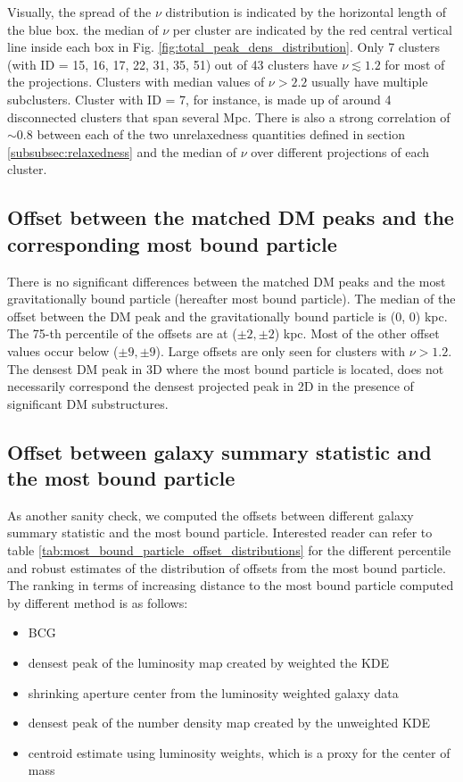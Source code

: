 Visually, the spread of the $\nu$ distribution is indicated by the horizontal 
length of the blue box. 
the median of $\nu$ per cluster are indicated by the red central vertical line
inside each box in Fig. 
\ref{fig:total_peak_dens_distribution}.
Only 7 clusters (with ID = 15, 16, 17, 22, 31, 35, 51) out of 43 clusters have $\nu
\lesssim 1.2$ for most of the projections.
Clusters with median values of $\nu > 2.2$ usually have multiple subclusters.
Cluster with ID = 7, for instance, is made up of around 4 disconnected clusters that span
several Mpc.  
There is also a strong correlation of $\sim 0.8$ 
between each of the two unrelaxedness quantities defined in section 
\ref{subsubsec:relaxedness}
and the median of $\nu$ over different projections of each cluster. 


\subsection{Offset between the matched DM peaks and the corresponding most
bound particle}
There is no significant differences between the matched DM peaks and 
the most gravitationally 
bound particle (hereafter most bound particle).
The median of the offset between the DM peak and the gravitationally bound
particle is (0, 0) kpc. The 75-th percentile of the offsets are at ($\pm2,\pm2$) kpc. 
Most of the other offset values occur below ($\pm 9, \pm 9$). Large offsets
are only seen for clusters with $\nu > 1.2$. The densest DM peak in 3D where
the most bound particle is located, does not
necessarily correspond the densest projected peak in 2D in the presence of 
significant DM substructures.   

\subsection{Offset between galaxy summary statistic and the most bound particle}
As another sanity check, we computed the offsets between different galaxy summary
statistic and the most bound particle. 
Interested reader can refer to table
\ref{tab:most_bound_particle_offset_distributions} for the different
percentile and robust estimates of the distribution of offsets from the most bound 
particle. 
The ranking in terms of increasing distance 
to the most bound particle computed by different method is as follows:
\begin{itemize}
	\item BCG 
	\item densest peak of the luminosity map created by weighted the KDE 
		\item shrinking aperture center from the luminosity weighted galaxy data
		\item densest peak of the number density map created by the unweighted KDE 
		\item centroid estimate using luminosity weights, which is a proxy for the
			center of mass
\end{itemize}


